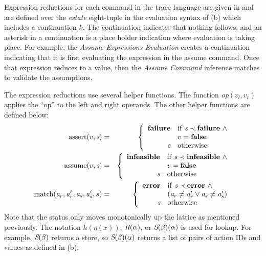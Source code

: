 Expression reductions for each command in the trace language are given
in  and are defined over the \textit{estate}
eight-tuple in the evaluation syntax of (b) which
includes a continuation $k$.  The  continuation indicates
that nothing follows, and an asterisk in a continuation is a place
holder indication where evaluation is taking place.  For example, the
\emph{Assume Expressions Evaluation} creates a continuation indicating
that it is first evaluating the expression in the assume command.
Once that expression reduces to a value, then the \emph{Assume
  Command} inference matches to validate the assumptions.


The expression reductions use several helper functions.  The function \emph{op}$(v_l,v_r)$
applies the ``op'' to the left and right operands.  The other helper functions are defined below:
\begin{eqnarray*}
\mathrm{assert}(v,\textit{s}) &=& \left\{ \begin{array}{rl}
                                       \textbf{failure} & \mathrm{if}~\textit{s} \prec \textbf{failure}\ \wedge \\
                                                      & v = \mathbf{false} \\
                                             \textit{s}  & \mathrm{otherwise}
                                    \end{array} \right .\\
\mathrm{assume}(v,\textit{s}) &=& \left\{ \begin{array}{rl}
                                       \textbf{infeasible} & \mathrm{if}~\textit{s} \prec \textbf{infeasible}\ \wedge \\
                                                         & v = \mathbf{false} \\
                                                \textit{s}  & \mathrm{otherwise}
                                    \end{array} \right . \\
\mathrm{match}(\mathit{a}_{r}, \mathit{a}^\prime_{r}, \mathit{a}_s, \mathit{a}^\prime_s,s) &=&  \left\{ \begin{array}{rl}
                                                              \textbf{\ensuremath{\mathbf{error}}} & \mathrm{if}~\textit{s} \prec \textbf{\ensuremath{\mathbf{error}}}\ \wedge \\
                                                                            & (\mathit{a}_r \neq \mathit{a}^\prime_r \vee \mathit{a}_s \neq \mathit{a}^\prime_s)\\
                                       \textit{s}  & \mathrm{otherwise}
                                    \end{array} \right .\\
\end{eqnarray*}
Note that the status only moves monotonically up the lattice as
mentioned previously.  The notation $h(\eta(x))$, $\textit{R}(\alpha)$, or
$\textit{S}(\beta)(\alpha)$ is used for lookup. For example, $\textit{S}(\beta)$
returns a store, so $\textit{S}(\beta)(\alpha)$ returns a list of pairs of
action IDs and values as defined in (b).

